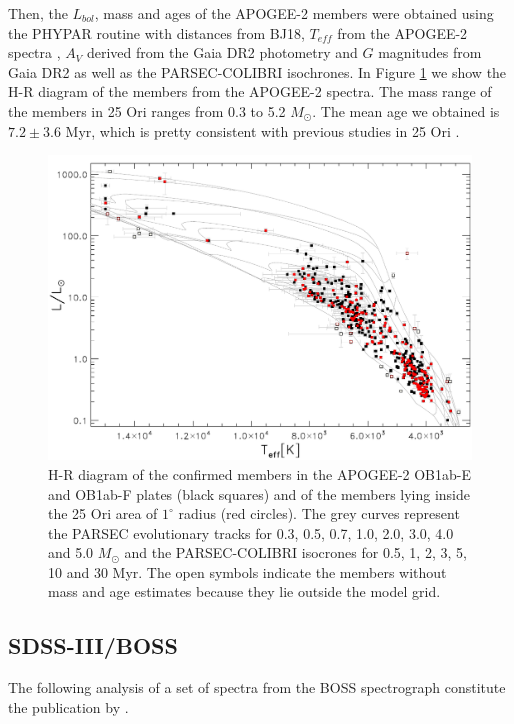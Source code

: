 \documentclass[12pt]{article}
\begin{document}
Then, the $L_{bol}$, mass and ages of the APOGEE-2 members were obtained using the PHYPAR routine with distances from BJ18, $T_{eff}$ from the APOGEE-2 spectra , $A_V$ derived from the Gaia DR2 photometry and $G$ magnitudes from Gaia DR2 as well as the PARSEC-COLIBRI isochrones. In Figure \ref{fig_APOGEE-2:HR} we show the H-R diagram of the members from the APOGEE-2 spectra. The mass range of the members in 25 Ori ranges from 0.3 to 5.2 $M_\odot$. The mean age we obtained is $7.2\pm3.6$ Myr, which is pretty consistent with previous studies in 25 Ori \citep[][ and references therein]{Briceno2018}.

\begin{figure}[ht!]
	\centering
	\includegraphics[width=1.\textwidth]{HR_APOGEE-2.pdf}
	\caption[H-R diagram of the 25 Ori confirmed members from APOGEE-2 spectra.]{H-R diagram of the confirmed members in the APOGEE-2 OB1ab-E and OB1ab-F plates (black squares) and of the members lying inside the 25 Ori area of $1^\circ$ radius (red circles). The grey curves represent the PARSEC evolutionary tracks for 0.3, 0.5, 0.7, 1.0, 2.0, 3.0, 4.0 and 5.0 $M_\odot$ and the PARSEC-COLIBRI isocrones for 0.5, 1, 2, 3, 5, 10 and 30 Myr. The open symbols indicate the members without mass and age estimates because they lie outside the model grid.}
	\label{fig_APOGEE-2:HR}
\end{figure}

\subsection{SDSS-III/BOSS \citep{Suarez2017}}
\label{sec:BOSS}
The following analysis of a set of spectra from the BOSS spectrograph constitute the publication by \citet{Suarez2017}.
\end{document}
